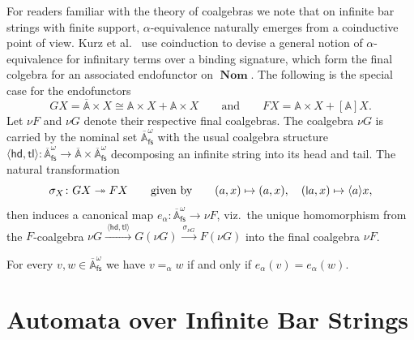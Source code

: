 \documentclass[10pt,a4paper]{amsart}
\newcommand{\midmid}{\hspace{0.2ex}{\rule[-0.1ex]{0.6pt}{1.65ex}}\hspace{0.2ex}}
\newcommand{\newletter}[1]{{\midmid}#1}
\newcommand{\barA}{\overline{\names}}
\numberwithin{equation}{section}
\newcommand{\xto}[1]{\xrightarrow{~#1~}}
\newcommand{\fs}{\mathsf{fs}}
\newcommand{\+}[1]{\mathcal{#1}\xspace}
\DeclareMathOperator{\Nom}{\mathbf{Nom}}
\newcommand{\names}{\mathbb{A}}
\theoremstyle{definition}
\begin{document}
\noindent For readers familiar with the theory of coalgebras we note that on infinite bar strings with finite support, $\alpha$-equivalence
naturally emerges from a coinductive point of view. Kurz et
al.~\cite{kpsv13} use coinduction to devise a general notion of
$\alpha$-equivalence for infinitary terms over a binding signature,
which form the final colgebra for an associated endofunctor on $\Nom$.
The following is the special case for the endofunctors
\[
  GX = \barA\times X \cong \names \times X + \names \times X
  \qquad\text{and}\qquad
  FX = \names\times X + [\names]X.
\]
Let $\nu F$ and $\nu G$ denote their respective final coalgebras.
The coalgebra $\nu G$ is carried by the nominal set
$\barA^\omega_\fs$ 
with the usual coalgebra structure
$\langle \mathsf{hd},\mathsf{tl}\rangle\colon \barA^\omega_\fs \to
\barA \times \barA^\omega_\fs$ decomposing an infinite string into its
head and tail. The natural transformation
\[
  \sigma_X\colon GX\twoheadrightarrow FX\qquad\text{given by}\qquad
  (a,x) \mapsto (a,x),\quad (\newletter {a},x) \mapsto \langle
  a\rangle x,
\]
then induces a canonical map $e_\alpha\colon \barA^\omega_\fs \to \nu F$,
viz.~the unique
homomorphism from the $F$-coalgebra
$\nu G \xto{\langle \mathsf{hd},\mathsf{tl}\rangle} G(\nu G)
\xto{\sigma_{\nu G}} F(\nu G)$ into the final coalgebra $\nu F$.
%
\begin{proposition}\label{lem:alpha-equiv-coalgebraic}
  For every $v,w\in \barA^\omega_\fs$ we have $v=_\alpha w$ if and
  only if $e_\alpha(v)=e_\alpha(w)$.
\end{proposition}
%
%
\section{Automata over Infinite Bar Strings}\label{sec:rnna}
\end{document}
